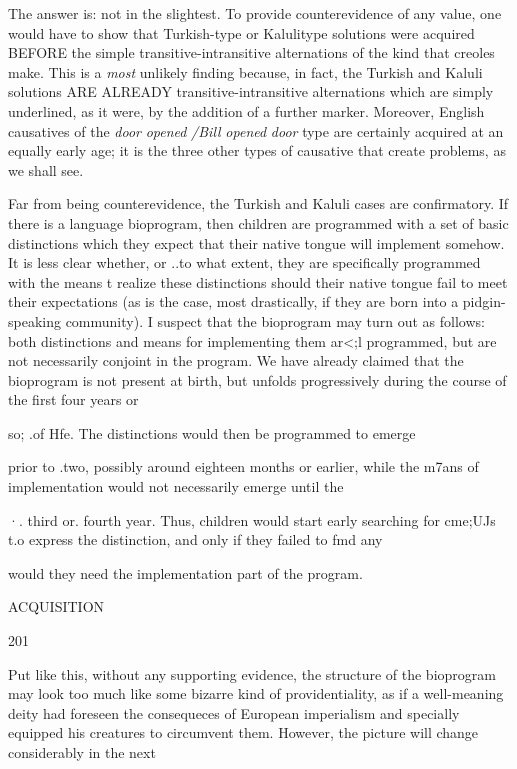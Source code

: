 The answer is: not in the slightest. To provide counterevidence of any value, one would have to show that Turkish-type or Kaluli\-type solutions were acquired BEFORE the simple transitive-intransitive alternations of the kind that creoles make. This is a \textit{most} unlikely finding because, in fact, the Turkish and Kaluli solutions ARE AL\-READY transitive-intransitive alternations which are simply under\-lined, as it were, by the addition of a further marker. Moreover, English causatives of the \textit{door} \textit{opened} \textit{/Bill} \textit{opened} \textit{door} type are certainly acquired at an equally early age; it is the three other types of causative that create problems, as we shall see.

Far from being counterevidence, the Turkish and Kaluli cases are confirmatory. If there is a language bioprogram, then children are programmed with a set of basic distinctions which they expect that their native tongue will implement somehow. It is less clear whether, or ..to what extent, they are specifically programmed with the means t realize these distinctions should their native tongue fail to meet their expectations (as is the case, most drastically, if they are born into a pidgin-speaking community). I suspect that the bioprogram may turn out as follows: both distinctions and means for implementing them ar{\textless};l programmed, but are not necessarily conjoint in the program. We have already claimed that the bioprogram is not present at birth, but unfolds progressively during the course of the first four years or

so; .of Hfe. The distinctions would then be programmed to emerge

prior to .two, possibly around eighteen months or earlier, while the m7ans of implementation would not necessarily emerge until the

·. third or. fourth year. Thus, children would start early searching for cme;UJs t.o express the distinction, and only if they failed to fmd any


would they need the implementation part of the program.

ACQUISITION

201

Put like this, without any supporting evidence, the structure of the bioprogram may look too much like some bizarre kind of provi\-dentiality, as if a well-meaning deity had foreseen the consequeces of European imperialism and specially equipped his creatures to circum\-vent them. However, the picture will change considerably in the next

